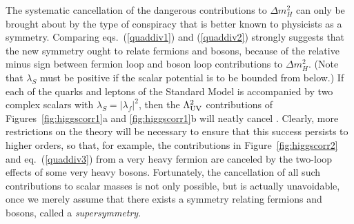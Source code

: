 \documentclass[12pt]{article}
\begin{document}
The systematic cancellation of the dangerous contributions to $\Delta
m_H^2$ can only be brought about by the type of conspiracy that is better
known to physicists as a symmetry. Comparing eqs.~(\ref{quaddiv1}) and
(\ref{quaddiv2}) strongly suggests that the new symmetry ought to relate
fermions and bosons, because of the relative minus sign between fermion
loop and boson loop contributions to $\Delta m_H^2$. (Note that
$\lambda_S$ must be positive if the scalar potential is to be bounded from
below.) If each of the quarks and leptons of the Standard Model is
accompanied by two complex scalars with $\lambda_S = |\lambda_f|^2$, then
the $\Lambda_{\rm UV}^2$ contributions of Figures~\ref{fig:higgscorr1}a
and \ref{fig:higgscorr1}b will neatly cancel \cite{quadscancel}. Clearly,
more restrictions on the theory will be necessary to ensure that this
success persists to higher orders, so that, for example, the contributions
in Figure~\ref{fig:higgscorr2} and eq.~(\ref{quaddiv3}) from a very heavy
fermion are canceled by the two-loop effects of some very heavy bosons.
Fortunately, the cancellation of all such contributions to scalar masses
is not only possible, but is actually unavoidable, once we merely assume
that there exists a symmetry relating fermions and bosons, called a 
{\it supersymmetry}. 
\end{document}
